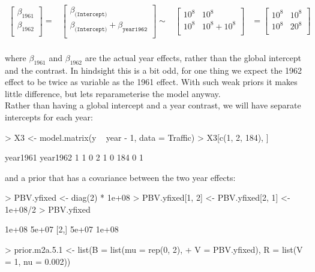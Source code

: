 \documentclass{article}
\begin{document}
\begin{equation}
\begin{array}{rccl}
\left[
\begin{array}{c}
 \beta_{1961}\\
 \beta_{1962}\\
\end{array}
\right]
=
&
\left[
\begin{array}{c}
 \beta_{\texttt{(Intercept)}}\\
 \beta_{\texttt{(Intercept)}}+\beta_{\texttt{year1962}}\\
\end{array}
\right]
\sim
&
\left[
\begin{array}{cc}
10^8&10^8\\
10^8&10^8+10^8\\
\end{array}
\right]
&=
\left[
\begin{array}{cc}
10^8&10^8\\
10^8&20^8\\
\end{array}
\right]\\
\end{array}
\end{equation}

where $\beta_{1961}$ and $\beta_{1962}$ are the actual year effects, rather than the global intercept and the contrast. In hindsight this is a bit odd, for one thing we expect the 1962 effect to be twice as variable as the 1961 effect. With such weak priors it makes little difference, but lets reparameterise the model anyway.\\

 Rather than having a global intercept and a year contrast, we will have separate intercepts for each year:

\begin{Schunk}
\begin{Sinput}
> X3 <- model.matrix(y ~ year - 1, data = Traffic)
> X3[c(1, 2, 184), ]
\end{Sinput}
\begin{Soutput}
    year1961 year1962
1          1        0
2          1        0
184        0        1
\end{Soutput}
\end{Schunk}

and a prior that has a covariance between the two year effects:

\begin{Schunk}
\begin{Sinput}
> PBV.yfixed <- diag(2) * 1e+08
> PBV.yfixed[1, 2] <- PBV.yfixed[2, 1] <- 1e+08/2
> PBV.yfixed
\end{Sinput}
\begin{Soutput}
      [,1]  [,2]
[1,] 1e+08 5e+07
[2,] 5e+07 1e+08
\end{Soutput}
\begin{Sinput}
> prior.m2a.5.1 <- list(B = list(mu = rep(0, 2), 
+     V = PBV.yfixed), R = list(V = 1, nu = 0.002))
\end{Sinput}
\end{Schunk}
\end{document}

